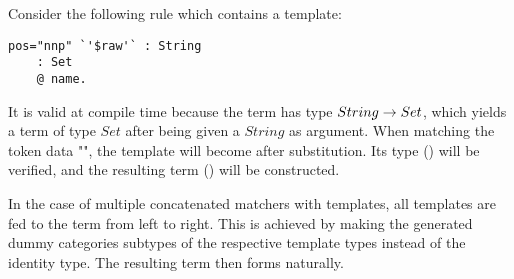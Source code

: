 \documentclass[main.tex]{subfiles}
\begin{document}
\begin{exampleenv}
Consider the following rule which contains a template:
\begin{lstlisting}
pos="nnp" `'$raw'` : String
    : Set
    @ name.
\end{lstlisting}
It is valid at compile time because the term  has type
$String \rightarrow Set$, which yields a term of type $Set$ after being given
a $String$ as argument.
When matching the token data "", the template
 will become
 after substitution. Its type
() will be verified, and the resulting term
() will be constructed.
\end{exampleenv}

In the case of multiple concatenated matchers with templates, all templates
are fed to the term from left to right. This is achieved by making the
generated dummy categories subtypes of the respective template types instead
of the identity type. The resulting term then forms naturally.
\end{document}
